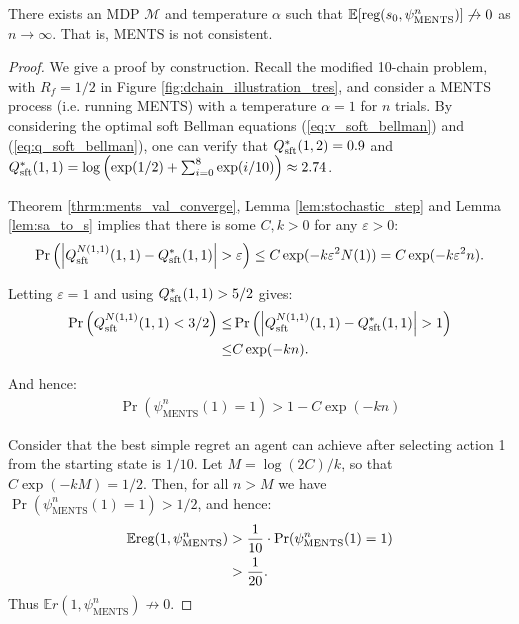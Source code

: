 \documentclass{article}
\newcommand{\bb}[1]{\mathbb{#1}}
\newcommand{\cl}[1]{\mathcal{#1}}
\newcommand{\Qsp}[3]{Q^{#3}_{\textnormal{sft}}(#1,#2)}
\newcommand{\Qss}[2]{Q^*_{\textnormal{sft}}(#1,#2)}
\newcommand{\reg}{\textnormal{reg}}
\theoremstyle{plain}
\begin{document}
\begin{appendices}
        \begin{customprop}{3.1}
            There exists an MDP $\cl{M}$ and temperature $\alpha$ such that $\bb{E}[\reg(s_0,\psi^n_{\textnormal{MENTS}})] \not\to 0$ as $n\to\infty$. That is, MENTS is not consistent.
        \end{customprop}
        
        \begin{proof}
            We give a proof by construction. Recall the modified 10-chain problem, with $R_f=1/2$ in Figure \ref{fig:dchain_illustration_tres}, and consider a MENTS process (i.e. running MENTS) with a temperature $\alpha=1$ for $n$ trials. By considering the optimal soft Bellman equations (\ref{eq:v_soft_bellman}) and (\ref{eq:q_soft_bellman}), one can verify that $\Qss{1}{2}=0.9$ and $\Qss{1}{1}=\log\left(\exp(1/2)+\sum_{i=0}^8\exp(i/10)\right)\approx 2.74$. 
            
            Theorem \ref{thrm:ments_val_converge}, Lemma \ref{lem:stochastic_step} and Lemma \ref{lem:sa_to_s} implies that there is some $C,k>0$ for any $\varepsilon > 0$:
            \begin{align}
                \Pr\left(\left| \Qsp{1}{1}{N(1,1)} - \Qss{1}{1}\right| > \varepsilon \right) \leq C\exp(-k\varepsilon^2 N(1)) = C\exp(-k\varepsilon^2 n).
            \end{align}
            
            Letting $\varepsilon=1$ and using $\Qss{1}{1}>5/2$ gives:
            \begin{align}
                \Pr\left(\Qsp{1}{1}{N(1,1)} < 3/2 \right) 
                    \leq& \Pr\left(\left| \Qsp{1}{1}{N(1,1)} - \Qss{1}{1}\right| > 1 \right) \\
                    \leq& C\exp(-kn).
            \end{align}
            
            And hence:
            \begin{align}
                \Pr(\psi^n_{\text{MENTS}}(1)=1) > 1 - C\exp(-kn)
            \end{align}
            
            Consider that the best simple regret an agent can achieve after selecting action 1 from the starting state is $1/10$. Let $M=\log(2C)/k$, so that $C\exp(-kM)=1/2$. Then, for all $n>M$ we have $\Pr(\psi^n_{\text{MENTS}}(1)=1)> 1/2$, and hence:
            \begin{align}
                \bb{E}\reg(1,\psi^n_{\text{MENTS}}) &> \frac{1}{10} \cdot \Pr(\psi^n_{\text{MENTS}}(1)=1) \\
                    &> \frac{1}{20}.
            \end{align}
            Thus $\bb{E}r(1,\psi^n_{\text{MENTS}})\not\rightarrow 0$.
        \end{proof}
        

\end{appendices}
\end{document}
